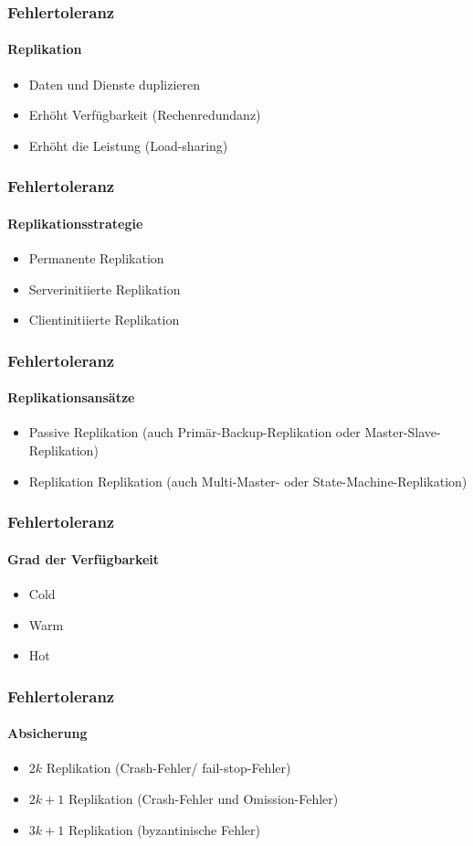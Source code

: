 \begin{frame}
  \frametitle{Fehlertoleranz}
  \framesubtitle{Replikation}
 \begin{itemize}
    \item Daten und Dienste duplizieren
    \item Erhöht Verfügbarkeit (Rechenredundanz)
    \item Erhöht die Leistung (Load-sharing)
  \end{itemize}    
\end{frame}

\begin{frame}
  \frametitle{Fehlertoleranz}
  \framesubtitle{Replikationsstrategie}
 \begin{itemize}
    \item Permanente Replikation
    \item Serverinitiierte Replikation
    \item Clientinitiierte Replikation
  \end{itemize}    
\end{frame}

\begin{frame}
  \frametitle{Fehlertoleranz}
  \framesubtitle{Replikationsansätze}
 \begin{itemize}
    \item Passive Replikation (auch Primär-Backup-Replikation oder Master-Slave-Replikation)
    \item Replikation Replikation (auch Multi-Master- oder State-Machine-Replikation)
  \end{itemize}    
\end{frame}

\begin{frame}
  \frametitle{Fehlertoleranz}
  \framesubtitle{Grad der Verfügbarkeit}
 \begin{itemize}
    \item Cold
    \item Warm 
    \item Hot
  \end{itemize}    
\end{frame}

\begin{frame}
  \frametitle{Fehlertoleranz}
  \framesubtitle{Absicherung}
 \begin{itemize}
    \item $2k$ Replikation (Crash-Fehler/ fail-stop-Fehler)
    \item $2k+1$ Replikation (Crash-Fehler und Omission-Fehler)
    \item $3k+1$ Replikation (byzantinische Fehler)
  \end{itemize}    
\end{frame}

